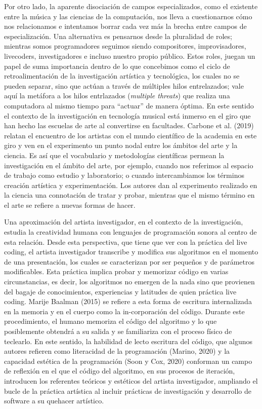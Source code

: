 Por otro lado, la aparente disociación de campos especializados, como el existente entre la música y las ciencias de la computación, nos lleva a cuestionarnos cómo nos relacionamos e intentamos borrar cada vez más la brecha entre campos de especialización. Una alternativa es pensarnos desde la pluralidad de roles; mientras somos programadores seguimos siendo compositores, improvisadores, livecoders, investigadores e incluso nuestro propio público. Estos roles, juegan un papel de suma importancia dentro de lo que concebimos como el ciclo de retroalimentación de la investigación artística y tecnológica, los cuales no se pueden separar, sino que actúan a través de múltiples hilos entrelazados; vale aquí la metáfora a los hilos entrlazados (\emph{multiple threats}) que realiza una computadora al mismo tiempo para “actuar” de manera óptima. En este sentido el contexto de la investigación en tecnología musical está inmerso en el giro que han hecho las escuelas de arte al convertirse en facultades. Carbone et al. (2019) relatan el encuentro de los artistas con el mundo científico de la academia en este giro y ven en el experimento un punto nodal entre los ámbitos del arte y la ciencia. Es así que el vocabulario y metodologías científicas permean la investigación en el ámbito del arte, por ejemplo, cuando nos referimos al espacio de trabajo como estudio y laboratorio; o cuando intercambiamos los términos creación artística y experimentación. Los autores dan al experimento realizado en la ciencia una connotación de tratar y probar, mientras que el mismo término en el arte se refiere a nuevas formas de hacer.

Una aproximación del artista investigador, en el contexto de la investigación, estudia la creatividad humana con lenguajes de programación sonora al centro de esta relación. Desde esta perspectiva, que tiene que ver con la práctica del live coding, el artista investigador transcribe y modifica sus algoritmos en el momento de una presentación, los cuales se caracterizan por ser pequeños y de parámetros modificables. Esta práctica implica probar y memorizar código en varias circunstancias, es decir, los algoritmos no emergen de la nada sino que provienen del bagaje de conocimientos, experiencias y latitudes de quien práctica live coding. Marije Baalman (2015) se refiere a esta forma de escritura internalizada en la memoria y en el cuerpo como la in-corporación del código. Durante este procedimiento, el humano memoriza el código del algoritmo y lo que posiblemente obtendrá a su salida y se familiariza con el proceso físico de teclearlo. En este sentido, la habilidad de lecto escritura del código, que algunos autores refieren como literacidad de la programación (Marino, 2020) y la capacidad estética de la programación (Soon y Cox, 2020) conforman un campo de reflexión en el que el código del algoritmo, en sus procesos de iteración, introducen los referentes teóricos y estéticos del artista investigador, ampliando el bucle de la práctica artística al incluir prácticas de investigación y desarrollo de software a su quehacer artístico.

